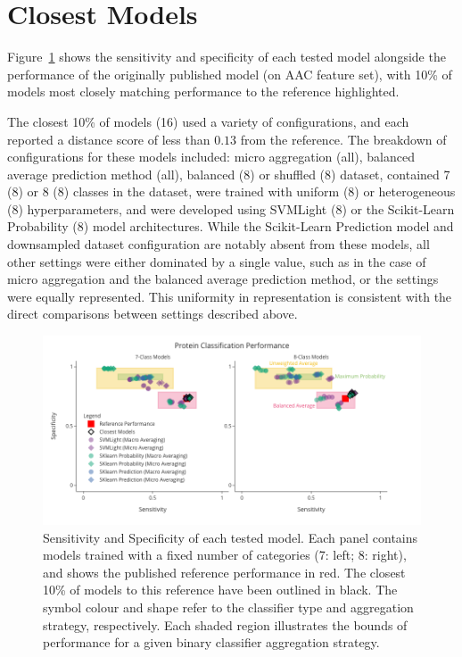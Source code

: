 \section{Closest Models}
Figure~\ref{fig:modelPerformance} shows the sensitivity 
and specificity of each tested model alongside the performance of the originally published model (on AAC feature set), 
with 10\% of models most closely matching performance to the reference highlighted.

The closest 10\% of models (16) used a variety of configurations, and each reported a distance score of less than
$0.13$ from the reference. The breakdown of configurations for these models included: micro aggregation (all), balanced
average prediction method (all), balanced (8) or shuffled (8) dataset, contained 7 (8) or 8 (8) classes in the dataset,
were trained with uniform (8) or heterogeneous (8) hyperparameters, and were developed using SVMLight (8) or the
Scikit-Learn Probability (8) model architectures. While the Scikit-Learn Prediction model and downsampled dataset configuration
are notably absent from these models, all other settings were either dominated by a single value, such as in the case
of micro aggregation and the balanced average prediction method, or the settings were equally represented. This
uniformity in representation is consistent with the direct comparisons between settings described above.

\begin{figure}[ht]
    \centering
    \includegraphics[width=\textwidth]{figures/14ModelPerformance.png}
    \caption{Sensitivity and Specificity of each tested model. Each panel contains models 
    trained with a fixed number of categories (7: left; 8: right), and shows the published 
    reference performance in red. The closest 10\% of models to this reference have been 
    outlined in black. The symbol colour and shape refer to the classifier type and aggregation 
    strategy, respectively. Each shaded region illustrates the bounds of performance for a given 
    binary classifier aggregation strategy.}
    \label{fig:modelPerformance}
\end{figure}

